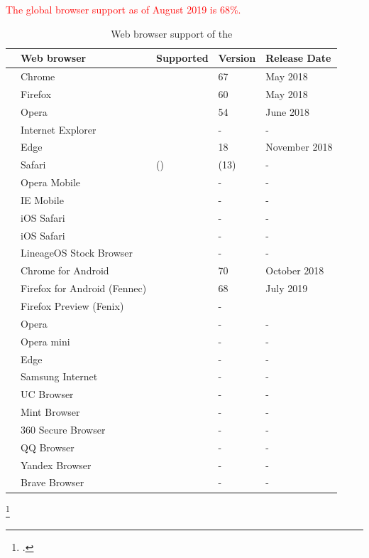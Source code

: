 \textcolor{red}{The global browser support as of August 2019 is 68\%.}
\begin{table}[ht]
	\begin{tabularx}{\textwidth}{l|p{5.3cm}|p{2cm}|p{1.9cm}|p{2.8cm}}
		& Web browser & Supported & Version & Release Date \\
		\hline
		\parbox[t]{2mm}{} & Chrome & \OK & 67 & May 2018 \\
		& Firefox & \OK & 60 & May 2018 \\
		& Opera & \OK & 54 & June 2018 \\
		& Internet Explorer & \NOOK & - & - \\
		& Edge & \OK & 18 & November 2018 \\
		& Safari & (\OK) & (13) & - \\
		\hline
		\parbox[t]{2mm}{} & Opera Mobile & \NOOK & - & - \\
		& IE Mobile & \NOOK & - & - \\
		& iOS Safari & \NOOK & - & - \\
		& iOS Safari & \NOOK & - & - \\
		\hline
		\parbox[t]{2mm}{} & LineageOS Stock Browser & \NOOK & - & - \\
		& Chrome for Android & \OK & 70 & October 2018 \\
		& Firefox for Android (Fennec) & \OK & 68 & July 2019 \\
		& Firefox Preview (Fenix) & \NOOK & - \\
		& Opera & \NOOK & - & - \\
		& Opera mini & \NOOK & - & - \\
		& Edge & \NOOK & - & - \\
		& Samsung Internet & \NOOK & - & - \\
		& UC Browser & \NOOK & - & - \\
		& Mint Browser & \NOOK & - & - \\
		& 360 Secure Browser & \NOOK & - & - \\
		& QQ Browser & \NOOK & - & - \\
		& Yandex Browser & \NOOK & - & - \\
		& Brave Browser & \NOOK & - & -
	\end{tabularx}
	\caption[Web browser support of the \wa]{Web browser support of the \wa\footnotemark}
	\label{tab:browser-support}
\end{table}
\footcitetexts[Sources:][]{chrome-webauthn}{firefox-webauthn}{safari-webauthn}{chrome-android-webauthn}[a detailed analysis of Android browsers is available on the CD in the appendix.]{firefox-android-webauthn}
\newpage

